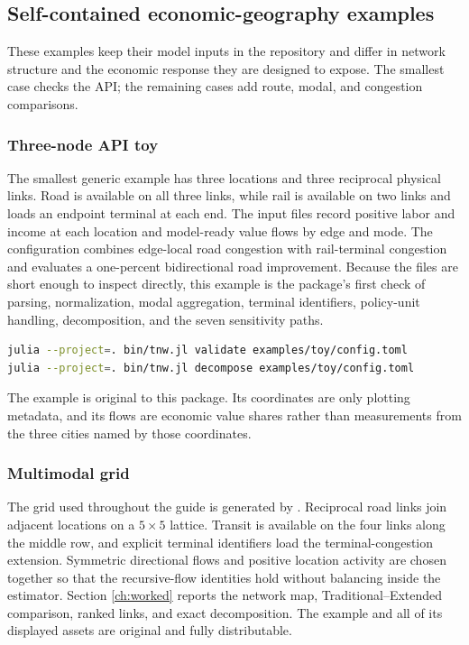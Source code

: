 \subsection{Self-contained economic-geography examples}

These examples keep their model inputs in the repository and differ in network
structure and the economic response they are designed to expose. The smallest
case checks the API; the remaining cases add route, modal, and congestion
comparisons.

\subsubsection{Three-node API toy}

The smallest generic example has three locations and three reciprocal physical
links. Road is available on all three links, while rail is available on two links
and loads an endpoint terminal at each end. The input files record positive
labor and income at each location and model-ready value flows by edge and
mode. The configuration combines edge-local road congestion with rail-terminal
congestion and evaluates a one-percent bidirectional road improvement. Because
the files are short enough to inspect directly, this example is the package's
first check of parsing, normalization, modal aggregation, terminal identifiers,
policy-unit handling, decomposition, and the seven sensitivity paths.

\begin{lstlisting}[language=bash]
julia --project=. bin/tnw.jl validate examples/toy/config.toml
julia --project=. bin/tnw.jl decompose examples/toy/config.toml
\end{lstlisting}

The example is original to this package. Its coordinates are only plotting
metadata, and its flows are economic value shares rather than measurements
from the three cities named by those coordinates.

\subsubsection{Multimodal grid}

The grid used throughout the guide is generated by
. Reciprocal road links join
adjacent locations on a \(5\times5\) lattice. Transit is available on the four
links along the middle row, and explicit terminal identifiers load the
terminal-congestion extension. Symmetric directional flows and positive
location activity are chosen together so that the recursive-flow identities
hold without balancing inside the estimator. Section \ref{ch:worked} reports
the network map, Traditional--Extended comparison, ranked links, and exact
decomposition. The example and all of its displayed assets are original and
fully distributable.

